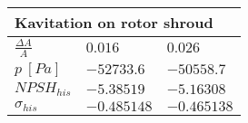 \vspace{20pt}\newline
\begin{tabular}{|l|l|l|}
\multicolumn{3}{l}{Kavitation on rotor shroud} \\ 
\hline
$\frac{\Delta A}{A}$ & $0.016$& $0.026$  \\ 
\hline
$p \ [Pa]$ & $-52733.6$& $-50558.7$  \\ 
\hline
$NPSH_{his}$ & $-5.38519$& $-5.16308$  \\ 
\hline
$\sigma_{his}$ & $-0.485148$& $-0.465138$  \\ 
\hline
\end{tabular}
